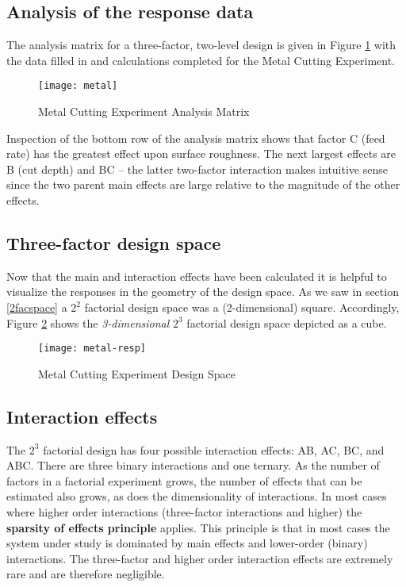 \subsection{Analysis of the response data}
The analysis matrix for a three-factor, two-level design is given in Figure \ref{fig5}  with the data filled in and calculations completed for the Metal Cutting Experiment.
\begin{figure}[h]\caption{Metal Cutting Experiment Analysis Matrix}\label{fig5}
\begin{center}
\texttt{[image: metal]}
\end{center}
\end{figure}
Inspection of the bottom row of the analysis matrix shows that factor C (feed rate) has the greatest effect upon surface roughness. The next largest effects are B (cut depth) and BC -- the latter two-factor interaction makes intuitive sense since the two parent main effects are large relative to the magnitude of the other effects.

\subsection{Three-factor design space}\label{DesignSpace}
Now that the main and interaction effects have been calculated it is helpful to visualize the responses in the geometry of the design space.  As we saw in section \ref{2facspace} a $2^{2}$ factorial design space was a (2-dimensional) square.  Accordingly, Figure \ref{fig6} shows the \textit{3-dimensional} $2^{3}$ factorial design space depicted as a cube.
\begin{figure}[h]\caption{Metal Cutting Experiment Design Space}\label{fig6}
\begin{center}
\texttt{[image: metal-resp]}
\end{center}
\end{figure}
\subsection{Interaction effects}
The $2^{3}$ factorial design has four possible interaction effects: AB, AC, BC, and ABC.  There are three binary interactions and one ternary.  As the number of factors in a factorial experiment grows, the number of effects that can be estimated also grows, as does the dimensionality of interactions.  In most cases where higher order interactions (three-factor interactions and higher) the \textbf{sparsity of effects principle} applies. This principle is that in most cases the system under study is dominated by main effects and lower-order (binary) interactions.  The three-factor and higher order interaction effects are extremely rare and are therefore negligible.\label{sparsity}

